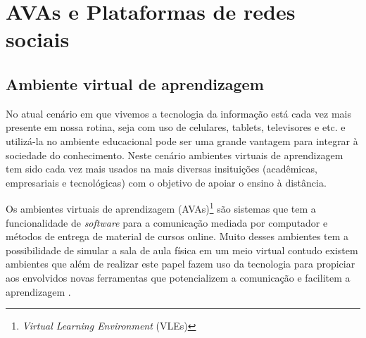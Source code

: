 \chapter{AVAs e Plataformas de redes sociais}
\label{avas-redes-sociais}
% 
\section{Ambiente virtual de aprendizagem}
\label{ava}
% 
No atual cenário em que vivemos a tecnologia da informação está cada vez mais presente em nossa rotina, seja com uso de celulares, tablets, televisores e etc. e utilizá-la no ambiente educacional pode ser uma grande vantagem para integrar à sociedade do conhecimento. Neste cenário ambientes virtuais de aprendizagem tem sido cada vez mais usados na mais diversas insituições (acadêmicas, empresariais e tecnológicas) com o objetivo de apoiar o ensino à distância.

Os ambientes virtuais de aprendizagem (AVAs)\footnote{\textit{Virtual Learning Environment} (VLEs)} são sistemas que tem a funcionalidade de \textit{software} para a comunicação mediada por computador e métodos de entrega de material de cursos online. Muito desses ambientes tem a possibilidade de simular a sala de aula física em um meio virtual contudo existem ambientes que além de realizar este papel fazem uso da tecnologia para propiciar aos envolvidos novas ferramentas que potencializem a comunicação e facilitem a aprendizagem \cite{schlemmer2005ambiente}.


